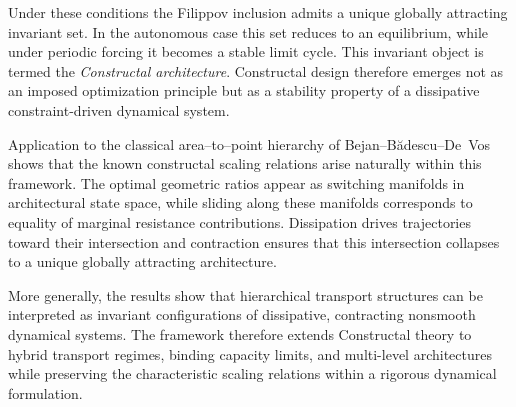 \documentclass[12pt]{article}
\theoremstyle{plain}
\theoremstyle{definition}
\theoremstyle{remark}
\begin{document}
\medskip
Under these conditions the Filippov inclusion admits a unique
globally attracting invariant set.
In the autonomous case this set reduces to an equilibrium,
while under periodic forcing it becomes a stable limit cycle.
This invariant object is termed the
\emph{Constructal architecture}.
Constructal design therefore emerges not as an imposed
optimization principle but as a stability property of a
dissipative constraint-driven dynamical system.

Application to the classical area--to--point hierarchy of
Bejan--B\u{a}descu--De~Vos shows that the known constructal
scaling relations arise naturally within this framework.
The optimal geometric ratios appear as switching manifolds
in architectural state space,
while sliding along these manifolds corresponds to equality of
marginal resistance contributions.
Dissipation drives trajectories toward their intersection and
contraction ensures that this intersection collapses to a unique
globally attracting architecture.

More generally, the results show that hierarchical transport
structures can be interpreted as invariant configurations of
dissipative, contracting nonsmooth dynamical systems.
The framework therefore extends Constructal theory to hybrid
transport regimes, binding capacity limits, and multi-level
architectures while preserving the characteristic scaling
relations within a rigorous dynamical formulation.
\end{document}
